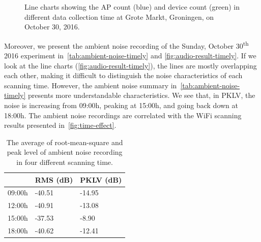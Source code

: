 \begin{figure}[H]
\begin{adjustwidth}{-4cm}{}
{{		  }
		}
		\end{adjustwidth}
		\caption[Line charts of ambient noise on October 30, 2016.]
		{Line charts showing the \ac{AP} count (blue) and device count (green) in different data collection time at Grote Markt, Groningen, on October 30, 2016.}
		\label{fig:time-effect}
		
	\end{figure}

	Moreover, we present the ambient noise recording of the Sunday, October 30\textsuperscript{th} 2016 experiment in~\autoref{tab:ambient-noise-timely} and \autoref{fig:audio-result-timely}. If we look at the line charts (\autoref{fig:audio-result-timely}), the lines are mostly overlapping each other, making it difficult to distinguish the noise characteristics of each scanning time. However, the ambient noise summary in~\autoref{tab:ambient-noise-timely} presents more understandable characteristics. We see that, in \ac{PKLV}, the noise is increasing from 09:00h, peaking at 15:00h, and going back down at 18:00h. The ambient noise recordings are correlated with the WiFi scanning results presented in~\autoref{fig:time-effect}.

	\begin{table}[h]
	\centering
	\caption[The average of RMS and PKLV of ambient noise in four scanning time.]
	{The average of root-mean-square and peak level of ambient noise recording in four different scanning time.}
	\label{tab:ambient-noise-timely}
	\begin{tabular}{lll}
	\toprule
	       & \ac{RMS} (dB) & \ac{PKLV} (dB) \\ \midrule
	09:00h & -40.51        & -14.95          \\
	12:00h & -40.91        & -13.08          \\
	15:00h & -37.53        & -8.90           \\
	18:00h & -40.62        & -12.41          \\ \bottomrule
	\end{tabular}
	\end{table}

